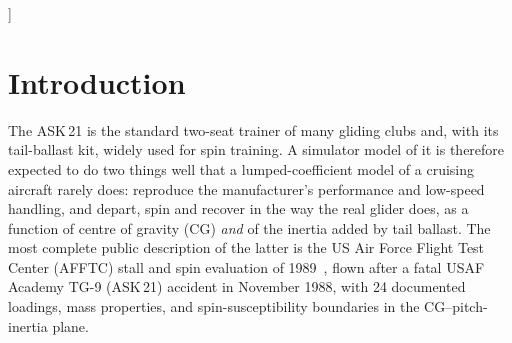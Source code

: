 \documentclass[10pt,a4paper,twocolumn]{article}
\newcommand{\vnine}{v9}
\begin{document}
\begin{@twocolumnfalse}
\begin{abstract}
and does not spin at any loading: with pro-spin controls it enters a spiral dive. \vnine{} reproduces the polar to \NpolRmsNine\,m/s
rms and the manual's stall speeds within a few km/h, and matches the AFFTC classification at \NmatchNine{} of 24 loadings. Its developed
spin is oscillatory at \NspinRateRng\,deg/s, and it recovers by the manual procedure in less than one turn. Its deficiencies are
quantified: a phugoid that diverges below about 115\,km/h, height loss per spin turn (\NspinFt{} vs.\ 200\,ft), spin pitch-oscillation
amplitude, the aft-CG $g$-break and the nose drop in dynamic stalls. A force-balance argument shows that the AFFTC height-loss figure
implies a vertical force coefficient at or above the two-dimensional flat-plate limit. This third issue adds the wing's bending, moves
the model to 240\,Hz and re-identifies the post-stall factors; Section~\ref{sec:review} lists the changes since the first issue.
\end{abstract}
\vspace{6pt}
\end{@twocolumnfalse}
]

\section{Introduction}
The ASK\,21 is the standard two-seat trainer of many gliding clubs and, with its tail-ballast kit, widely used for spin
training. A simulator model of it is therefore expected to do two things well that a lumped-coefficient
model of a cruising aircraft rarely does: reproduce the manufacturer's performance and low-speed handling, and depart,
spin and recover in the way the real glider does, as a function of centre of gravity (CG) \emph{and} of the inertia
added by tail ballast. The most complete public description of the latter is the US Air Force Flight Test Center (AFFTC)
stall and spin evaluation of 1989~\cite{afftc}, flown after a fatal USAF Academy TG-9 (ASK\,21) accident in November 1988, with 24
documented loadings, mass properties, and spin-susceptibility boundaries in the CG--pitch-inertia plane.
\end{document}
